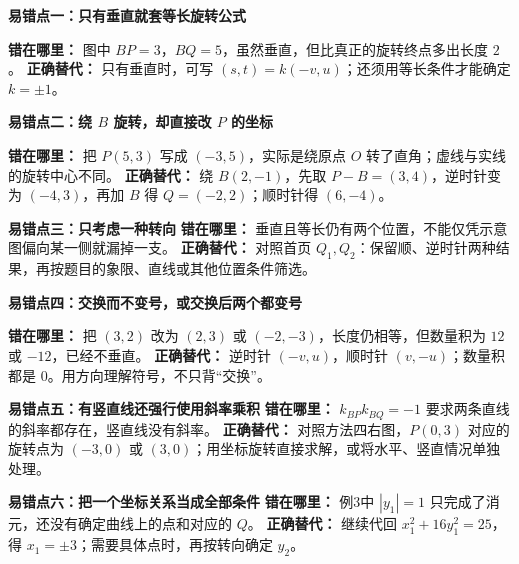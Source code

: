 \newpage
\begin{trapbox}
    \textbf{\textcolor{CTrap}{易错点一：只有垂直就套等长旋转公式}}
    
    \textbf{错在哪里：} 图中 $BP=3$，$BQ=5$，虽然垂直，但比真正的旋转终点多出长度 $2$。
    \textbf{正确替代：} 只有垂直时，可写 $(s,t)=k(-v,u)$；还须用等长条件才能确定 $k=\pm1$。

    \medskip
    \textbf{\textcolor{CTrap}{易错点二：绕 $B$ 旋转，却直接改 $P$ 的坐标}}
    
    \textbf{错在哪里：} 把 $P(5,3)$ 写成 $(-3,5)$，实际是绕原点 $O$ 转了直角；虚线与实线的旋转中心不同。
    \textbf{正确替代：} 绕 $B(2,-1)$，先取 $P-B=(3,4)$，逆时针变为 $(-4,3)$，再加 $B$ 得 $Q=(-2,2)$；顺时针得 $(6,-4)$。

    \medskip
    \textbf{\textcolor{CTrap}{易错点三：只考虑一种转向}}
    \textbf{错在哪里：} 垂直且等长仍有两个位置，不能仅凭示意图偏向某一侧就漏掉一支。
    \textbf{正确替代：} 对照首页 $Q_1,Q_2$：保留顺、逆时针两种结果，再按题目的象限、直线或其他位置条件筛选。

    \newpage
    \textbf{\textcolor{CTrap}{易错点四：交换而不变号，或交换后两个都变号}}
    
    \textbf{错在哪里：} 把 $(3,2)$ 改为 $(2,3)$ 或 $(-2,-3)$，长度仍相等，但数量积为 $12$ 或 $-12$，已经不垂直。
    \textbf{正确替代：} 逆时针 $(-v,u)$，顺时针 $(v,-u)$；数量积都是 $0$。用方向理解符号，不只背“交换”。

    \medskip
    \textbf{\textcolor{CTrap}{易错点五：有竖直线还强行使用斜率乘积}}
    \textbf{错在哪里：} $k_{BP}k_{BQ}=-1$ 要求两条直线的斜率都存在，竖直线没有斜率。
    \textbf{正确替代：} 对照方法四右图，$P(0,3)$ 对应的旋转点为 $(-3,0)$ 或 $(3,0)$；用坐标旋转直接求解，或将水平、竖直情况单独处理。

    \medskip
    \textbf{\textcolor{CTrap}{易错点六：把一个坐标关系当成全部条件}}
    \textbf{错在哪里：} 例3中 $|y_1|=1$ 只完成了消元，还没有确定曲线上的点和对应的 $Q$。
    \textbf{正确替代：} 继续代回 $x_1^2+16y_1^2=25$，得 $x_1=\pm3$；需要具体点时，再按转向确定 $y_2$。
\end{trapbox}
